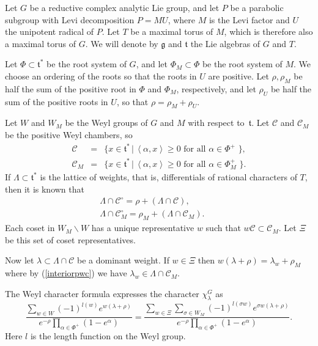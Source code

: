 \documentclass[11pt]{amsart}
\begin{document}
Let $G$ be a reductive complex analytic Lie group, and let $P$ be
a parabolic subgroup with Levi decomposition $P = M U$, where $M$
is the Levi factor and $U$ the unipotent radical of $P$. Let $T$
be a maximal torus of $M$, which is therefore also a maximal torus
of $G$. We will denote by $\mathfrak{g}$ and $\mathfrak{t}$ the
Lie algebras of $G$ and $T$.

Let $\Phi \subset \mathfrak{t}^{\ast}$ be the root system of $G$,
and let $\Phi_M \subset \Phi$ be the root system of $M$. We choose
an ordering of the roots so that the roots in $U$ are positive.
Let $\rho, \rho_M$ be half the sum of the positive root in $\Phi$
and $\Phi_M$, respectively, and let $\rho_U$ be half the sum of
the positive roots in $U$, so that $\rho = \rho_M + \rho_U$.

Let $W$ and $W_M$ be the Weyl groups of $G$ and $M$ with respect
to~$\mathfrak{t}$. Let $\mathcal{C}$ and $\mathcal{C}_M$ be the
positive Weyl chambers, so
\begin{eqnarray*}
  \mathcal{C} & = & \{ x \in \mathfrak{t}^{\ast} \, | \, \text{$\left\langle
  \alpha, x \right\rangle \geqslant 0$ for all $\alpha \in \Phi^+$ \},}\\
  \mathcal{C}_M & = & \{ x \in \mathfrak{t}^{\ast} \, | \, \text{$\left\langle
  \alpha, x \right\rangle \geqslant 0$ for all $\alpha \in \Phi^+_M$ \} .}
\end{eqnarray*}
If $\Lambda \subset \mathfrak{t}^{\ast}$ is the lattice of
weights, that is, differentials of rational characters of $T$,
then it is known that
\begin{eqnarray}
  \Lambda \cap \mathcal{C}^{\circ} = \rho + ( \Lambda \cap \mathcal{C}), &  &
  \nonumber\\
  \Lambda \cap \mathcal{C}^{\circ}_M = \rho_M + ( \Lambda \cap \mathcal{C}_M )
  . &  &  \label{interiorpwc}
\end{eqnarray}
Each coset in $W_M \backslash W$ has a unique representative $w$
such that $w\mathcal{C} \subset \mathcal{C}_M$. Let $\Xi$ be this
set of coset representatives.

Now let $\lambda \subset \Lambda \cap \mathcal{C}$ be a dominant
weight. If $w \in \Xi$ then $w ( \lambda + \rho ) = \lambda_w +
\rho_M$ where by (\ref{interiorpwc}) we have $\lambda_w \in
\Lambda \cap \mathcal{C}_M$.

The Weyl character formula expresses the character
$\chi_{\lambda}^G$ as
\[ \frac{\sum_{w \in W} ( - 1 )^{l ( w )} e^{w ( \lambda + \rho )}}{e^{- \rho}
   \prod_{\alpha \in \Phi^+} ( 1 - e^{\alpha} )} = \frac{\sum_{w \in \Xi}
   \sum_{\sigma \in W_M} ( - 1 )^{l ( \sigma w )} e^{\sigma w ( \lambda + \rho
   )}}{e^{- \rho} \prod_{\alpha \in \Phi^+} ( 1 - e^{\alpha} )} . \]
Here $l$ is the length function on the Weyl group.
\end{document}
